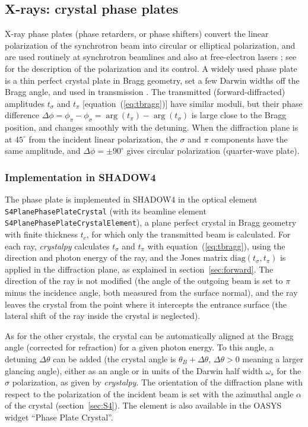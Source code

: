 \documentclass{iucr}
\begin{document}
\subsection{X-rays: crystal phase plates}\label{sec:phasesifters}
X-ray phase plates (phase retarders, or phase shifters) convert the linear polarization of the synchrotron beam into circular or elliptical polarization, and are used routinely at synchrotron beamlines \cite{Freeland2002,Bouchenoire2003,Bouchenoire2012,Francoual2013} and also at free-electron lasers \cite{Suzuki2014}; see \cite{Detlefs2012,Suzuki2023} for the description of the polarization and its control. A widely used phase plate is a thin perfect crystal plate in Bragg geometry, set a few Darwin widths off the Bragg angle, and used in transmission \cite{hirano1993nim,PolarizationDraft}. The transmitted (forward-diffracted) amplitudes $t_\sigma$ and $t_\pi$ [equation~(\ref{eq:tbragg})] have similar moduli, but their phase difference $\Delta\phi=\phi_\pi-\phi_\sigma=\arg(t_\pi)-\arg(t_\sigma)$ is large close to the Bragg position, and changes smoothly with the detuning. When the diffraction plane is at $45^\circ$ from the incident linear polarization, the $\sigma$ and $\pi$ components have the same amplitude, and $\Delta\phi=\pm90^\circ$ gives circular polarization (quarter-wave plate).

\subsubsection{Implementation in SHADOW4}

The phase plate is implemented in SHADOW4 in the optical element {\tt S4PlanePhasePlateCrystal} (with its beamline element {\tt S4PlanePhasePlateCrystalElement}), a plane perfect crystal in Bragg geometry with finite thickness $t_c$, for which only the transmitted beam is calculated. For each ray, {\it crystalpy} calculates $t_\sigma$ and $t_\pi$ with equation~(\ref{eq:tbragg}), using the direction and photon energy of the ray, and the Jones matrix $\mathrm{diag}(t_\sigma,t_\pi)$ is applied in the diffraction plane, as explained in section~\ref{sec:forward}. The direction of the ray is not modified (the angle of the outgoing beam is set to $\pi$ minus the incidence angle, both measured from the surface normal), and the ray leaves the crystal from the point where it intercepts the entrance surface (the lateral shift of the ray inside the crystal is neglected).

As for the other crystals, the crystal can be automatically aligned at the Bragg angle (corrected for refraction) for a given photon energy. To this angle, a detuning $\Delta\theta$ can be added (the crystal angle is $\theta_B+\Delta\theta$, $\Delta\theta>0$ meaning a larger glancing angle), either as an angle or in units of the Darwin half width $\omega_s$ for the $\sigma$ polarization, as given by {\it crystalpy}. The orientation of the diffraction plane with respect to the polarization of the incident beam is set with the azimuthal angle $\alpha$ of the crystal (section~\ref{sec:S4}). The element is also available in the OASYS widget ``Phase Plate Crystal''.
\end{document}

